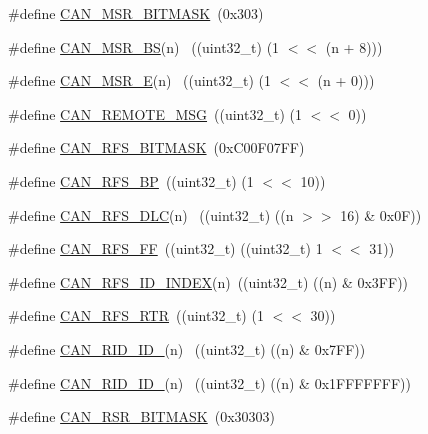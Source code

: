 \begin{DoxyCompactItemize}
\item 
\#define \hyperlink{group__CAN__17XX__40XX_ga6f49f63724cbd8724eb783eb7b6d2074}{C\+A\+N\+\_\+\+M\+S\+R\+\_\+\+B\+I\+T\+M\+A\+SK}~(0x303)
\item 
\#define \hyperlink{group__CAN__17XX__40XX_ga83d3e9dfe74cae086b17ddd71a8f35ea}{C\+A\+N\+\_\+\+M\+S\+R\+\_\+\+BS}(n)      ~((uint32\+\_\+t) (1 $<$$<$ (n + 8)))
\item 
\#define \hyperlink{group__CAN__17XX__40XX_ga0e486503e4628a3d432064b8d5ebbe8e}{C\+A\+N\+\_\+\+M\+S\+R\+\_\+E}(n)        ~((uint32\+\_\+t) (1 $<$$<$ (n + 0)))
\item 
\#define \hyperlink{group__CAN__17XX__40XX_ga1b77aaba2a11dc258857a633277b7b9d}{C\+A\+N\+\_\+\+R\+E\+M\+O\+T\+E\+\_\+\+M\+SG}~((uint32\+\_\+t) (1 $<$$<$ 0))
\item 
\#define \hyperlink{group__CAN__17XX__40XX_gaae5a748ec50af6827ba0536db45e48e4}{C\+A\+N\+\_\+\+R\+F\+S\+\_\+\+B\+I\+T\+M\+A\+SK}~(0x\+C00\+F07\+F\+F)
\item 
\#define \hyperlink{group__CAN__17XX__40XX_ga3ce764619664805bd640def59318426b}{C\+A\+N\+\_\+\+R\+F\+S\+\_\+\+BP}~((uint32\+\_\+t) (1 $<$$<$ 10))
\item 
\#define \hyperlink{group__CAN__17XX__40XX_ga6f8438ca8831affefb0c9dbad9bdf9f0}{C\+A\+N\+\_\+\+R\+F\+S\+\_\+\+D\+LC}(n)        ~((uint32\+\_\+t) ((n $>$$>$ 16) \& 0x0\+F))
\item 
\#define \hyperlink{group__CAN__17XX__40XX_ga02abf35a3c80ac7be66fa94945d48f56}{C\+A\+N\+\_\+\+R\+F\+S\+\_\+\+FF}~((uint32\+\_\+t) ((uint32\+\_\+t) 1 $<$$<$ 31))
\item 
\#define \hyperlink{group__CAN__17XX__40XX_gac392aec22ad3737b7750bb77e173fb72}{C\+A\+N\+\_\+\+R\+F\+S\+\_\+\+I\+D\+\_\+\+I\+N\+D\+EX}(n)~((uint32\+\_\+t) ((n) \& 0x3\+F\+F))
\item 
\#define \hyperlink{group__CAN__17XX__40XX_gac276a6ce0a89fe58afd91907438022ca}{C\+A\+N\+\_\+\+R\+F\+S\+\_\+\+R\+TR}~((uint32\+\_\+t) (1 $<$$<$ 30))
\item 
\#define \hyperlink{group__CAN__17XX__40XX_ga29694e79064bd1e207a1a5085512dae3}{C\+A\+N\+\_\+\+R\+I\+D\+\_\+\+I\+D\+\_}(n)            ~((uint32\+\_\+t) ((n) \& 0x7\+F\+F))
\item 
\#define \hyperlink{group__CAN__17XX__40XX_ga859af5301f8a7d21efdfe136070f0e47}{C\+A\+N\+\_\+\+R\+I\+D\+\_\+\+I\+D\+\_}(n)            ~((uint32\+\_\+t) ((n) \& 0x1\+F\+F\+F\+F\+F\+F\+F))
\item 
\#define \hyperlink{group__CAN__17XX__40XX_ga0c56e3e5f89db118cd719437f74e085e}{C\+A\+N\+\_\+\+R\+S\+R\+\_\+\+B\+I\+T\+M\+A\+SK}~(0x30303)
$$
\end{DoxyCompactItemize}
